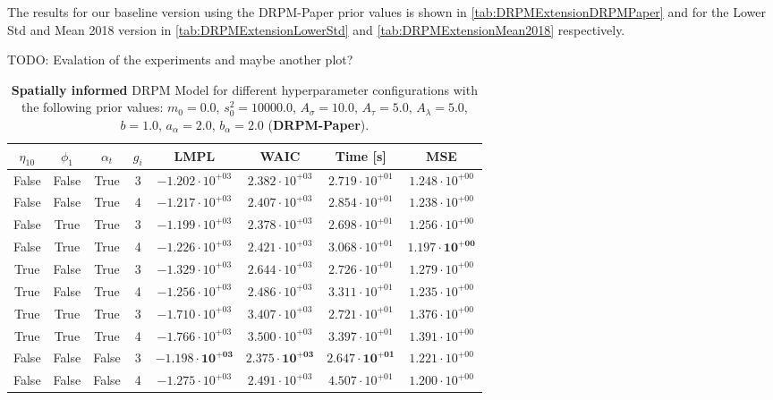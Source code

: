 \documentclass[12pt,a4paper]{article}
\begin{document}
The results for our baseline version using the DRPM-Paper prior values is shown in \cref{tab:DRPMExtensionDRPMPaper} and
for the Lower Std and Mean 2018 version in \cref{tab:DRPMExtensionLowerStd} and \cref{tab:DRPMExtensionMean2018} respectively.

TODO: Evalation of the experiments and maybe another plot?

\begin{table}
\caption{\textbf{Spatially informed} DRPM Model for different hyperparameter configurations with the following prior values: $m_0 = 0.0$, $s_0^2 = 10000.0$, $A_\sigma = 10.0$, $A_\tau = 5.0$, $A_\lambda = 5.0$, $b = 1.0$, $a_\alpha = 2.0$, $b_\alpha = 2.0$ (\textbf{DRPM-Paper}).}
\centering\begin{tabular}{cccccccc}
\toprule
$\eta_{10}$ & $\phi_1$ & $\alpha_t$ & $g_i$ & LMPL & WAIC & Time [s] & MSE \\
\midrule
False & False & True & 3 & $-1.202 \cdot 10^{+03}$ & $2.382 \cdot 10^{+03}$ & $2.719 \cdot 10^{+01}$ & $1.248 \cdot 10^{+00}$ \\
False & False & True & 4 & $-1.217 \cdot 10^{+03}$ & $2.407 \cdot 10^{+03}$ & $2.854 \cdot 10^{+01}$ & $1.238 \cdot 10^{+00}$  \\
False & True & True & 3 & $-1.199 \cdot 10^{+03}$ & $2.378 \cdot 10^{+03}$ & $2.698 \cdot 10^{+01}$ & $1.256 \cdot 10^{+00}$  \\
False & True & True & 4 & $-1.226 \cdot 10^{+03}$ & $2.421 \cdot 10^{+03}$ & $3.068 \cdot 10^{+01}$ & $\mathbf{1.197 \cdot 10^{+00}}$  \\
True & False & True & 3 & $-1.329 \cdot 10^{+03}$ & $2.644 \cdot 10^{+03}$ & $2.726 \cdot 10^{+01}$ & $1.279 \cdot 10^{+00}$  \\
True & False & True & 4 & $-1.256 \cdot 10^{+03}$ & $2.486 \cdot 10^{+03}$ & $3.311 \cdot 10^{+01}$ & $1.235 \cdot 10^{+00}$  \\
True & True & True & 3 & $-1.710 \cdot 10^{+03}$ & $3.407 \cdot 10^{+03}$ & $2.721 \cdot 10^{+01}$ & $1.376 \cdot 10^{+00}$ \\
True & True & True & 4 & $-1.766 \cdot 10^{+03}$ & $3.500 \cdot 10^{+03}$ & $3.397 \cdot 10^{+01}$ & $1.391 \cdot 10^{+00}$ \\
False & False & False & 3 & $\mathbf{-1.198 \cdot 10^{+03}}$ & $\mathbf{2.375 \cdot 10^{+03}}$ & $\mathbf{2.647 \cdot 10^{+01}}$ & $1.221 \cdot 10^{+00}$  \\
False & False & False & 4 & $-1.275 \cdot 10^{+03}$ & $2.491 \cdot 10^{+03}$ & $4.507 \cdot 10^{+01}$ & $1.200 \cdot 10^{+00}$  \\

\end{tabular}
\end{table}
\end{document}
